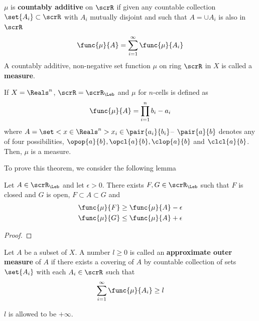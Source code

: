 \begin{definition}
    \(\mu\) is \textbf{countably additive} on \(\scrR\) if given any countable collection \(\set{A_i} \subset \scrR\) with \(A_i\) mutually disjoint and such that \(A = \cup A_i\) is also in \(\scrR\)
    \begin{equation*}
        \func{\mu}{A} = \sum_{i = 1}^{\infty} \func{\mu}{A_i}
    \end{equation*}
    A countably additive, non-negative set function \(\mu\) on ring \(\scrR\) in \(X\) is called a \textbf{measure}.
\end{definition}

\begin{theorem}
    If \(X = \Reals^n\), \(\scrR = \scrR_{\Leb}\) and \(\mu\) for \(n\)-cells is defined as
    \begin{equation*}
        \func{\mu}{A} = \prod_{i = 1}^n b_i - a_i
    \end{equation*}
    where \(A = \set<x \in \Reals^n>{x_i \in \pair{a_i}{b_i}}\)-- \(\pair{a}{b}\) denotes any of  four possibilities, \(\opop{a}{b}, \opcl{a}{b}, \clop{a}{b}\) and \(\clcl{a}{b}\). Then, \(\mu\) is a measure.
\end{theorem}
To prove this theorem, we consider the following lemma 
\begin{lemma}
    Let \(A \in \scrR_{\Leb}\) and let \(\epsilon > 0\). There exists \(F,G \in \scrR_{\Leb}\) such that \(F\) is closed and \(G\) is open, \(F \subset A \subset G\) and 
    \begin{align*}
        \func{\mu}{F} &\geq \func{\mu}{A} - \epsilon\\
        \func{\mu}{G} &\leq \func{\mu}{A} + \epsilon
    \end{align*}
\end{lemma}
\begin{prooflemma}
    
\end{prooflemma}

\begin{proof}
    
\end{proof}

\begin{definition}
    Let \(A\) be a subset of \(X\). A number \(l\geq 0\) is called an \textbf{approximate outer measure} of \(A\) if there exists a covering of \(A\) by countable collection of sets \(\set{A_i}\) with each \(A_i\in \scrR\) such that 
    \begin{equation*}
        \sum_{i = 1}^{\infty} \func{\mu}{A_i} \geq l
    \end{equation*}
\end{definition}
\begin{remark}
    \(l\) is allowed to be \(+\infty\).
\end{remark}


